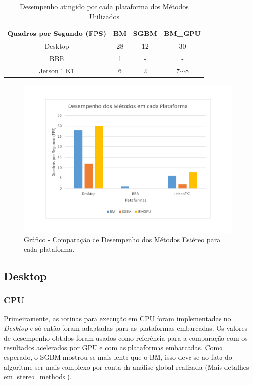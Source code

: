 \begin{table}[]
\centering
\caption{Desempenho atingido por cada plataforma dos Métodos Utilizados}
\label{resultsCPUGPU}
\begin{tabular}{|c|c|c|c|}
\hline
Quadros por Segundo (FPS)       & BM & SGBM & BM\_GPU  \\ \hline
Desktop   & 28 & 12   & 30       \\ \hline
BBB       & 1  & -    & -        \\ \hline
Jetson TK1 & 6  & 2    & 7$\sim$8 \\ \hline
\end{tabular}
\end{table}

\begin{figure}[H]
 	\centering
 	\includegraphics[scale=0.5]{./Resources/grafico_desempenho.pdf}
 	\caption{Gráfico - Comparação de Desempenho dos Métodos Estéreo para cada plataforma.}
 	\label{grafico_desempenho}
\end{figure}

\subsection{Desktop}
\subsubsection{CPU}

Primeiramente, as rotinas para execução em CPU foram implementadas no \textit{Desktop} e só então foram adaptadas para as plataformas embarcadas. Os valores de desempenho obtidos foram usados como referência para a comparação com os resultados acelerados por GPU e com as plataformas embarcadas. Como esperado, o SGBM mostrou-se mais lento que o BM, isso deve-se ao fato do algoritmo ser mais complexo por conta da análise global realizada (Mais detalhes em \ref{stereo_methods}). 

